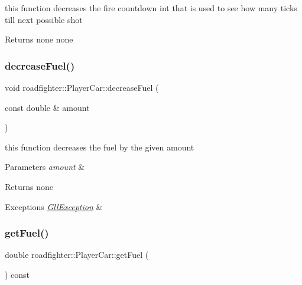 this function decreases the fire countdown int that is used to see how many ticks till next possible shot \begin{DoxyReturn}{Returns}
none  none 
\end{DoxyReturn}
\mbox{\label{classroadfighter_1_1PlayerCar_ab4c61f903639603aaa59f8222a2ecf94}} 
\subsubsection{\texorpdfstring{decrease\+Fuel()}{decreaseFuel()}}
{\footnotesize\ttfamily void roadfighter\+::\+Player\+Car\+::decrease\+Fuel (\begin{DoxyParamCaption}\item[{const double \&}]{amount }\end{DoxyParamCaption})}

this function decreases the fuel by the given amount 
\begin{DoxyParams}{Parameters}
{\em amount} & \\
\hline
\end{DoxyParams}
\begin{DoxyReturn}{Returns}
none 
\end{DoxyReturn}

\begin{DoxyExceptions}{Exceptions}
{\em \hyperlink{classroadfighter_1_1GllException}{Gll\+Exception}} & \\
\hline
\end{DoxyExceptions}
\mbox{\label{classroadfighter_1_1PlayerCar_aefc7f96fae66baecef10861a6b1fa0f2}} 
\subsubsection{\texorpdfstring{get\+Fuel()}{getFuel()}}
{\footnotesize\ttfamily double roadfighter\+::\+Player\+Car\+::get\+Fuel (\begin{DoxyParamCaption}{ }\end{DoxyParamCaption}) const}

